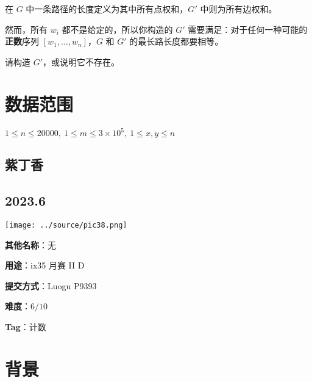 \documentclass[a4paper,10pt]{article}
\begin{document}
在 $G$ 中一条路径的长度定义为其中所有点权和，$G'$ 中则为所有边权和。

然而，所有 $w_i$ 都不是给定的，所以你构造的 $G'$ 需要满足：对于任何一种可能的\textbf{正数}序列 $[w_1,\ldots,w_n]$，$G$ 和 $G'$ 的最长路长度都要相等。

请构造 $G'$，或说明它不存在。

\section*{数据范围}

$1\leq n\leq 20000,\ 1\leq m\leq 3\times 10^5,\ 1\leq x,y\leq n$

\newpage

\vspace*{\fill}
\begin{center}

\section{紫丁香}

\subsection*{2023.6}

\vspace{10pt}

\texttt{[image: ../source/pic38.png]}

\vspace{10pt}

\textbf{其他名称}：无

\vspace{10pt}

\textbf{用途}：ix35 月赛 II D

\vspace{10pt}

\textbf{提交方式}：Luogu P9393

\vspace{10pt}

\textbf{难度}：$6/10$

\vspace{10pt}

\textbf{Tag}：计数

\end{center}
\vspace*{\fill}

\newpage

\section*{背景}
\end{document}
